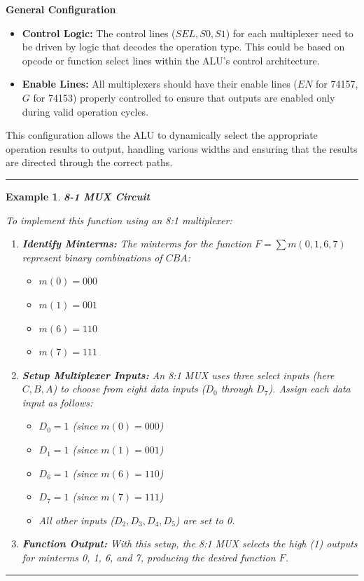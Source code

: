 \documentclass[12pt]{article}
\newtheorem{example}{Example}
\newenvironment{examp}
{\vspace{0.5cm}
 \hrule
\vspace{0.5cm}
\begin{example}}
{\hrule
\vspace{0.5cm}
\end{example}}
\begin{document}
\textbf{General Configuration}
\begin{itemize}
	\item \textbf{Control Logic:} The control lines (\( SEL, S0, S1 \)) for each multiplexer need to be driven by logic that decodes the operation type. This could be based on opcode or function select lines within the ALU's control architecture.
	\item \textbf{Enable Lines:} All multiplexers should have their enable lines (\( EN \) for 74157, \( G \) for 74153) properly controlled to ensure that outputs are enabled only during valid operation cycles.
\end{itemize}

This configuration allows the ALU to dynamically select the appropriate operation results to output, handling various widths and ensuring that the results are directed through the correct paths.

\begin{examp}
	\textbf{8-1 MUX Circuit}

	To implement this function using an 8:1 multiplexer:

	\begin{enumerate}
		\item \textbf{Identify Minterms:} The minterms for the function \( F = \sum m(0, 1, 6, 7) \) represent binary combinations of \( CBA \):
		      \begin{itemize}
			      \item \( m(0) = 000 \)
			      \item \( m(1) = 001 \)
			      \item \( m(6) = 110 \)
			      \item \( m(7) = 111 \)
		      \end{itemize}

		\item \textbf{Setup Multiplexer Inputs:} An 8:1 MUX uses three select inputs (here \( C, B, A \)) to choose from eight data inputs (\( D_0 \) through \( D_7 \)). Assign each data input as follows:
		      \begin{itemize}
			      \item \( D_0 = 1 \) (since \( m(0) = 000 \))
			      \item \( D_1 = 1 \) (since \( m(1) = 001 \))
			      \item \( D_6 = 1 \) (since \( m(6) = 110 \))
			      \item \( D_7 = 1 \) (since \( m(7) = 111 \))
			      \item All other inputs (\( D_2, D_3, D_4, D_5 \)) are set to 0.
		      \end{itemize}

		\item \textbf{Function Output:} With this setup, the 8:1 MUX selects the high (1) outputs for minterms 0, 1, 6, and 7, producing the desired function \( F \).
	\end{enumerate}
\end{examp}
\end{document}
